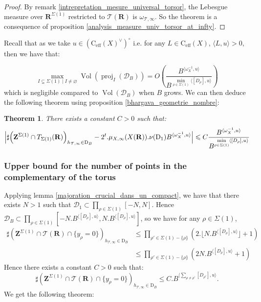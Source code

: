 \documentclass{proc-l}
\newcommand{\R}{\mathbf{R}}
\newcommand{\Z}{\mathbf{Z}}
\newcommand{\cone}{\text{C}_{\text{eff}}(X)}
\DeclareMathOperator{\proj}{proj}
\DeclareMathOperator{\Vol}{Vol}
\newcommand{\stackT}{\mathcal{T}}
\newcommand{\w}{\omega}
\newtheorem{theorem}{Theorem}[section]
\theoremstyle{definition}
\theoremstyle{remark}
\numberwithin{equation}{section}
\begin{document}
\begin{proof}
    By remark \ref{intrepretation_mesure_universal_torsor}, the Lebesgue measure over $\R^{\Sigma(1)}$ restricted to $\stackT(\R)$ is $\w_{\stackT,\infty}$. So the theorem is a consequence of proposition \ref{analysis_measure_univ_torsor_at_infty}.
\end{proof}

Recall that as we take $u \in (\cone^{\vee})^{\circ}$  i.e. for any $L \in \cone$, $\langle L,u \rangle > 0 $, then we have that: 

$$\max\limits_{ I \subsetneq \Sigma(1) \mid I \neq \varnothing } \Vol(\proj_I(\mathcal{D}_B)) = O\left( \frac{B^{\langle \w_X^{-1},u\rangle}}{B^{ \min\limits_{\rho \in \Sigma(1)} \langle [D_{\rho}],u\rangle } } \right)$$which is negligible compared to $\Vol(\mathcal{D}_B)$ when $B$ grows. We can then deduce the following theorem using proposition \ref{bhargava_geometrie_nombre}:


\begin{theorem}\label{estimation_lattice}
    There exists a constant $C > 0$ such that:
    $$\Big| \sharp \Bigl( \Z^{\Sigma(1)} \cap T_{\Sigma(1)}(\R) \Bigr)_{h_{\stackT,\infty} \in \mathrm{D}_{B}}  - 2^t . \mu_{X,\infty}(X(\R)). \nu(\mathrm{D}_1) B^{ \langle \w_{X}^{-1} , u \rangle } \Big| \leqslant C \frac{B^{\langle \w_X^{-1},u\rangle}}{B^{ \min\limits_{\rho \in \Sigma(1)} \langle [D_{\rho}],u\rangle } } $$
\end{theorem}

\subsubsection{Upper bound for the number of points in the complementary of the torus}

Applying lemma \ref{majoration_crucial_dans_un_compact}, we have that there exists $N > 1$ such that $\mathcal{D}_1 \subset \prod\limits_{\rho \in \Sigma(1)} [-N,N]$. Hence $\mathcal{D}_B \subset  \prod\limits_{\rho \in \Sigma(1)} \left[ -N.B^{\langle [D_{\rho}] , u \rangle},N.B^{\langle [D_{\rho}] , u \rangle} \right] $, so we have for any $\rho \in \Sigma(1)$,
\begin{align*}
    \sharp\left(\Z^{\Sigma(1)} \cap \stackT(\R) \cap \{y_{\rho} = 0 \} \right)_{h_{\stackT,\infty} \in \mathrm{D}_B} &\leqslant \prod\limits_{\rho' \in \Sigma(1)-\{\rho\}} \left( 2.\lfloor N.B^{\langle [D_{\rho}] , u \rangle} \rfloor + 1 \right) \\
    &\leqslant \prod\limits_{\rho' \in \Sigma(1)-\{\rho\}} \left( 2 N.B^{\langle [D_{\rho}] , u \rangle} + 1 \right)
\end{align*}Hence there exists a constant $C > 0$ such that:
$$\sharp\left(\Z^{\Sigma(1)} \cap \stackT(\R) \cap \{y_{\rho} = 0 \} \right)_{h_{\stackT,\infty} \in \mathrm{D}_B} \leqslant C. B^{\langle \sum\limits_{\rho \neq \rho'} [D_{\rho'}] , u \rangle} .$$We get the following theorem:
\end{document}
